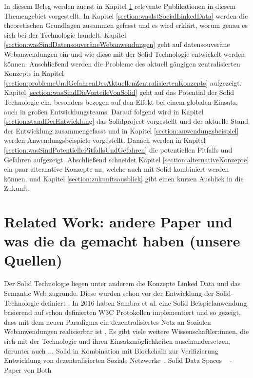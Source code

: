 \documentclass[acmtog]{acmart}
\begin{document}
In diesem Beleg werden zuerst in Kapitel \ref{section:relatedWork} relevante Publikationen in diesem Themengebiet vorgestellt. In Kapitel \ref{section:wasIstSocialLinkedData} werden die theoretischen Grundlagen zusammen gefasst und es wird erklärt, worum genau es sich bei der Technologie handelt. Kapitel \ref{section:wasSindDatensouveräneWebanwendungen} geht auf datensouveräne Webanwendungen ein und wie diese mit der Solid Technologie entwickelt werden können. Anschließend werden die Probleme des aktuell gängigen zentralisierten Konzepts in Kapitel \ref{section:problemeUndGefahrenDesAktuellenZentralisiertenKonzepts} aufgezeigt. Kapitel \ref{section:wasSindDieVorteileVonSolid} geht auf das Potential der Solid Technologie ein, besonders bezogen auf den Effekt bei einem globalen Einsatz, auch in großen Entwicklungsteams. Darauf folgend wird in Kapitel \ref{section:standDerEntwicklung} das Solidproject vorgestellt und der aktuelle Stand der Entwicklung zusammengefasst und in Kapitel \ref{section:anwendungsbeispiel} werden Anwendungsbeispiele vorgestellt. Danach werden in Kapitel \ref{section:wasSindPotentiellePitfallsUndGefahren} die potentiellen Pitfalls und Gefahren aufgezeigt. Abschließend schneidet Kapitel \ref{section:alternativeKonzepte} ein paar alternative Konzepte an, welche auch mit Solid kombiniert werden können, und Kapitel \ref{section:zukunftsausblick} gibt einen kurzen Ausblick in die Zukunft.


\section{Related Work: andere Paper und was die da gemacht haben (unsere Quellen)}\label{section:relatedWork}

Der Solid Technologie liegen unter anderem die Konzepte Linked Data und das Semantic Web zugrunde. Diese wurden schon vor der Entwicklung der Solid-Technologie definiert \cite{blumauer2006semantic}.
In 2016 haben Sambra et al. eine Solid Beispielanwendung basierend auf schon definierten W3C Protokollen implementiert und so gezeigt, dass mit dem neuen Paradigma ein dezentralisiertes Netz an Sozialen Webanwendungen realisierbar ist \cite{sambra2016solid}.
Es gibt viele weitere Wissenschaftler:innen, die sich mit der Technologie und ihren Einsatzmöglichkeiten auseinandersetzen, darunter auch ...
Solid in Kombination mit Blockchain zur Verifizierung ~\cite{ramachandran2020towards}
Entwicklung von dezentralisierten Soziale Netzwerke~\cite{yeung2023decentralization}.
Solid Data Spaces ~\cite{meckler2023web}
- Paper von Both 
\end{document}
